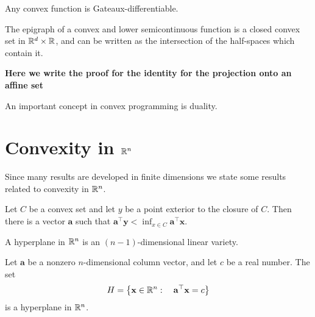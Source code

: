 \begin{definition}
\end{definition}
\begin{theorem}
	Any convex function is Gateaux-differentiable.
\end{theorem}
\begin{theorem}
	The epigraph of a convex and lower semicontinuous function is a closed convex set in $\mathbb{R}^d\times\mathbb{R}$, and can be written as the intersection of the half-spaces which contain it.
\end{theorem}
	\textbf{Here we write the proof for the identity for the projection onto an affine set}
\begin{definition}
\end{definition}
\begin{theorem}
\end{theorem}

An important concept in convex programming is duality.


\begin{definition}[Duality]

\end{definition}

\section{Convexity in $\mathbb{R}^n$}
Since many results are developed in finite dimensions we state some results related to convexity in $\mathbb{R}^n$.
\begin{theorem}
Let $C$ be a convex set and let $y$ be a point exterior to the closure of $C$. Then there is a vector $\mathbf{a}$ such that $\mathbf{a}^\top \mathbf{y} < \inf_{x\in C} \mathbf{a}^\top \mathbf{x}$. 
\end{theorem}

\begin{definition}
	A hyperplane in $\mathbb{R}^n$ is an $(n-1)$-dimensional linear variety.
\end{definition}

\begin{proposition}
	Let $\mathbf{a}$ be a nonzero $n$-dimensional column vector, and let $c$ be a real number. The set
	\begin{equation*}
		H=\left\lbrace \mathbf{x}\in \mathbb{R}^n:\quad \mathbf{a}^\top \mathbf{x}=c \right\rbrace
	\end{equation*}
	is a hyperplane in $\mathbb{R}^n$.
\end{proposition}

